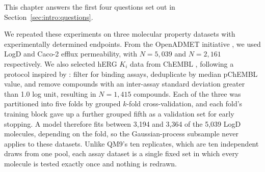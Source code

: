 This chapter answers the first four questions set out in Section~\ref{sec:intro:questions}.


We repeated these experiments on three molecular property datasets with experimentally determined endpoints. From the OpenADMET initiative \citep{openadmet}, we used LogD and Caco-2 efflux permeability, with $N = 5{,}039$ and $N = 2{,}161$ respectively. We also selected hERG $K_i$ data from ChEMBL \citep{Zdrazil2023}, following a protocol inspired by \citet{landrum2024}: filter for binding assays, deduplicate by median pChEMBL value, and remove compounds with an inter-assay standard deviation greater than 1.0 log unit, resulting in $N = 1{,}415$ compounds. Each of the three was partitioned into five folds by grouped $k$-fold cross-validation, and each fold's training block gave up a further grouped fifth as a validation set for early stopping. A model therefore fits between 3,194 and 3,364 of the 5,039 LogD molecules, depending on the fold, so the Gaussian-process subsample never applies to these datasets. Unlike QM9's ten replicates, which are ten independent draws from one pool, each assay dataset is a single fixed set in which every molecule is tested exactly once and nothing is redrawn.

